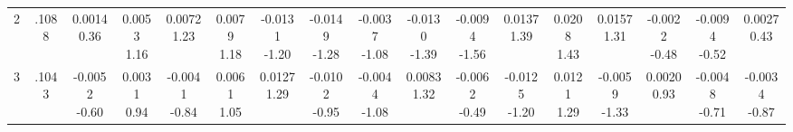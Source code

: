 \begin{landscape}
\begin{center}
{\begin{adjustbox}{max width=\textheight}
\begin{tabular}{lcccccccccccccccc}
2 & .1088 & \shortstack{0.0014\\0.36} & \shortstack{0.0053\\1.16} & \shortstack{0.0072\\1.23} & \shortstack{0.0079\\1.18} & \shortstack{-0.0131\\-1.20} & \shortstack{-0.0149\\-1.28} & \shortstack{-0.0037\\-1.08} & \shortstack{-0.0130\\-1.39} & \shortstack{-0.0094\\-1.56} & \shortstack{0.0137\\1.39} & \shortstack{0.0208\\1.43} & \shortstack{0.0157\\1.31} & \shortstack{-0.0022\\-0.48} & \shortstack{-0.0094\\-0.52} & \shortstack{0.0027\\0.43} \\
3 & .1043 & \shortstack{-0.0052\\-0.60} & \shortstack{0.0031\\0.94} & \shortstack{-0.0041\\-0.84} & \shortstack{0.0061\\1.05} & \shortstack{0.0127\\1.29} & \shortstack{-0.0102\\-0.95} & \shortstack{-0.0044\\-1.08} & \shortstack{0.0083\\1.32} & \shortstack{-0.0062\\-0.49} & \shortstack{-0.0125\\-1.20} & \shortstack{0.0121\\1.29} & \shortstack{-0.0059\\-1.33} & \shortstack{0.0020\\0.93} & \shortstack{-0.0048\\-0.71} & \shortstack{-0.0034\\-0.87} \\

\end{tabular}
\end{adjustbox}}
\end{center}
\end{landscape}

